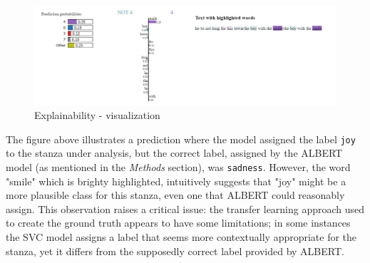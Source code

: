 \begin{figure}[H]
    \centering
    \includegraphics[scale= 0.55]{pictures/expl.png}
    \caption{Explainability - visualization}
    \label{fig:expl}
\end{figure}

The figure above illustrates a prediction where the model assigned the label \texttt{joy} to the stanza under analysis, but the correct label, assigned by the ALBERT model (as mentioned in the \textit{Methods} section), was \texttt{sadness}.
However, the word "smile" which is brighty highlighted, intuitively suggests that "joy" might be a more plausible class for this stanza, even one that ALBERT could reasonably assign. 
This observation raises a critical issue: the transfer learning approach used to create the ground truth appears to have some limitations; in some instances the SVC model assigns a label that seems more contextually appropriate for the stanza, 
yet it differs from the supposedly correct label provided by ALBERT.
